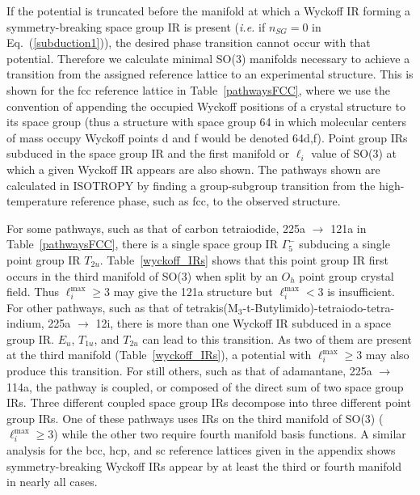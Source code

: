 \documentclass[preprint]{iucr}              %
\begin{document}
If the potential is truncated before the manifold at which a Wyckoff
IR forming a symmetry-breaking space group IR is present
(\emph{i.e.} if $n_{SG}=0$ in Eq.~(\ref{subduction1})), the desired
phase transition cannot occur with that potential. Therefore we
calculate minimal SO(3) manifolds necessary to achieve a transition
from the assigned reference lattice to an experimental structure.
This is shown for the fcc reference lattice in Table~\ref{pathwaysFCC}, where we
use the convention of appending the occupied Wyckoff positions of a crystal
structure to its space group (thus a structure with space group 64 in which
molecular centers of mass occupy Wyckoff points d and f would be denoted 64d,f).
Point group IRs subduced in the space group IR and the first
manifold or $\ell_i$ value of SO(3) at which a given Wyckoff IR appears are also
shown.  The pathways shown are calculated in {I\small SOTROPY} by
finding a group-subgroup transition from the high-temperature reference phase,
such as fcc, to the observed structure.

For some pathways, such as that of carbon tetraiodide, 225a
$\rightarrow$ 121a in Table~\ref{pathwaysFCC}, there is a single
space group IR $\Gamma_5^-$ subducing a single point group IR
$T_{2u}$. Table~\ref{wyckoff_IRs} shows that this point group IR
first occurs in the third manifold of SO(3) when split by an $O_h$
point group crystal field.  Thus $\ell_i^{\mathrm{max}}\geq 3$ may
give the 121a structure but $\ell_i^{\mathrm{max}} < 3$ is insufficient. For
other pathways, such as that of
tetrakis(M$_3$-t-Butylimido)-tetraiodo-tetra-indium, 225a
$\rightarrow$ 12i, there is more than
one Wyckoff IR subduced in a space group IR. $E_u$, $T_{1u}$, and
$T_{2u}$ can lead to this transition. As two of them are present at the
third manifold (Table~\ref{wyckoff_IRs}), a potential with
$\ell_i^{\mathrm{max}}\geq 3$ may also produce this transition. For still
others, such as that of adamantane,
225a $\rightarrow$ 114a, the pathway is
coupled, or composed of the direct sum of two space group IRs.
Three different coupled space group IRs decompose into three
different point group IRs. One of these pathways uses IRs on the
third manifold of SO(3) ($\ell^{\mathrm{max}}_i\geq 3$) while the
other two require fourth manifold basis functions. A similar analysis
for the bcc, hcp, and sc reference
lattices given in the appendix shows symmetry-breaking
Wyckoff IRs appear by at least the third or fourth manifold in
nearly all cases.
\end{document}
